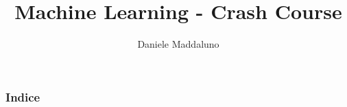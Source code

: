 \documentclass{beamer}
\title{Machine Learning - Crash Course}
\author{Daniele Maddaluno}
\date{\academicyear}
\begin{document}
\begin{frame}
	\titlepage %
\end{frame}

\begin{frame}[allowframebreaks]
	\frametitle{Indice} %
	\tableofcontents %
\end{frame}
 


 









%

\end{document}
